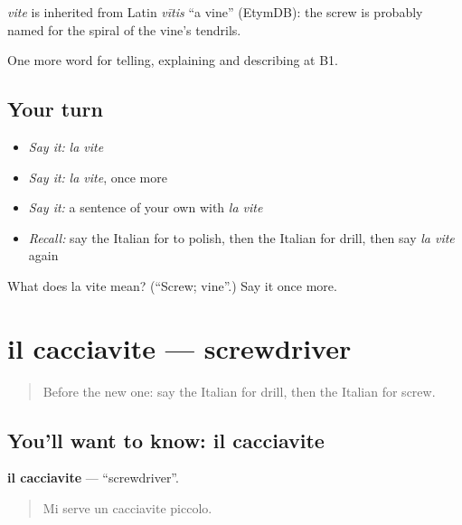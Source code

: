 \begin{cousinweb}
\emph{vite} is inherited from Latin \emph{vītis} \textquotedblleft{}a vine\textquotedblright{} (EtymDB): the screw is probably named for the spiral of the vine's tendrils.
\end{cousinweb}

\begin{grammarlens}[title={What you've built}]
One more word for telling, explaining and describing at B1.
\end{grammarlens}

\subsection*{Your turn}
\begin{itemize}
\raggedright
  \item \emph{Say it:} \emph{la vite}
  \item \emph{Say it:} \emph{la vite}, once more
  \item \emph{Say it:} a sentence of your own with \emph{la vite}
  \item \emph{Recall:} say the Italian for to polish, then the Italian for drill, then say \emph{la vite} again
\end{itemize}

\begin{tcolorbox}[breakable,colback=teal!4,colframe=teal!35!black,title={Before you move on}]
What does la vite mean? (\textquotedblleft{}Screw; vine\textquotedblright{}.) Say it once more.
\end{tcolorbox}
\section[il cacciavite]{il cacciavite — screwdriver}

\label{lesson:IT-C535-cacciavite}



\begin{quote}
Before the new one: say the Italian for drill, then the Italian for screw.
\end{quote}

\subsection*{You'll want to know: il cacciavite}
\textbf{il cacciavite} — \textquotedblleft{}screwdriver\textquotedblright{}.

\begin{quote}
Mi serve un cacciavite piccolo.
\end{quote}

